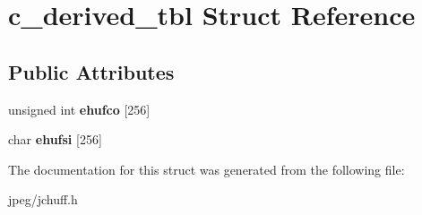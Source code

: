 \hypertarget{structc__derived__tbl}{}\section{c\+\_\+derived\+\_\+tbl Struct Reference}
\label{structc__derived__tbl}
\subsection*{Public Attributes}
\begin{DoxyCompactItemize}
\item 
unsigned int {\bfseries ehufco} \mbox{[}256\mbox{]}\hypertarget{structc__derived__tbl_acb8d0ecc41a6d9e2d1631122368de665}{}\label{structc__derived__tbl_acb8d0ecc41a6d9e2d1631122368de665}

\item 
char {\bfseries ehufsi} \mbox{[}256\mbox{]}\hypertarget{structc__derived__tbl_afbf7d9e461bf60c975e26af7404479ee}{}\label{structc__derived__tbl_afbf7d9e461bf60c975e26af7404479ee}

\end{DoxyCompactItemize}


The documentation for this struct was generated from the following file\+:\begin{DoxyCompactItemize}
\item 
jpeg/jchuff.\+h\end{DoxyCompactItemize}
